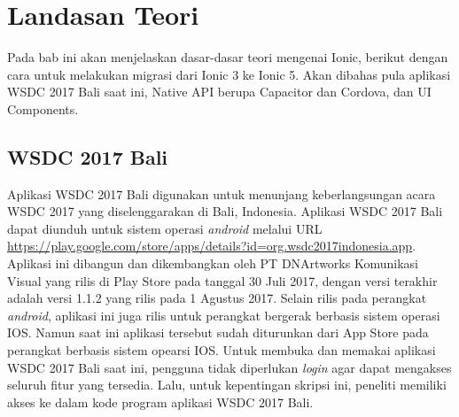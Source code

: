\setcounter{secnumdepth}{4}
\chapter{Landasan Teori}
\label{chap:teori}

Pada bab ini akan menjelaskan dasar-dasar teori mengenai Ionic, berikut dengan cara untuk melakukan migrasi dari Ionic 3 ke Ionic 5. Akan dibahas pula aplikasi WSDC 2017 Bali saat ini, Native API berupa Capacitor dan Cordova, dan UI Components.

\section{WSDC 2017 Bali}
\label{sec:wsdc2017bali}

Aplikasi WSDC 2017 Bali digunakan untuk menunjang keberlangsungan acara WSDC 2017 yang diselenggarakan di Bali, Indonesia. Aplikasi WSDC 2017 Bali dapat diunduh untuk sistem operasi {\it android} melalui URL \url{https://play.google.com/store/apps/details?id=org.wsdc2017indonesia.app}. Aplikasi ini dibangun dan dikembangkan oleh PT DNArtworks Komunikasi Visual yang rilis di Play Store pada tanggal 30 Juli 2017, dengan versi terakhir adalah versi 1.1.2 yang rilis pada 1 Agustus 2017. Selain rilis pada perangkat {\it android}, aplikasi ini juga rilis untuk perangkat bergerak berbasis sistem operasi IOS. Namun saat ini aplikasi tersebut sudah diturunkan dari App Store pada perangkat berbasis sistem opearsi IOS. Untuk membuka dan memakai aplikasi WSDC 2017 Bali saat ini, pengguna tidak diperlukan {\it login} agar dapat mengakses seluruh fitur yang tersedia. Lalu, untuk kepentingan skripsi ini, peneliti memiliki akses ke dalam kode program aplikasi WSDC 2017 Bali.

